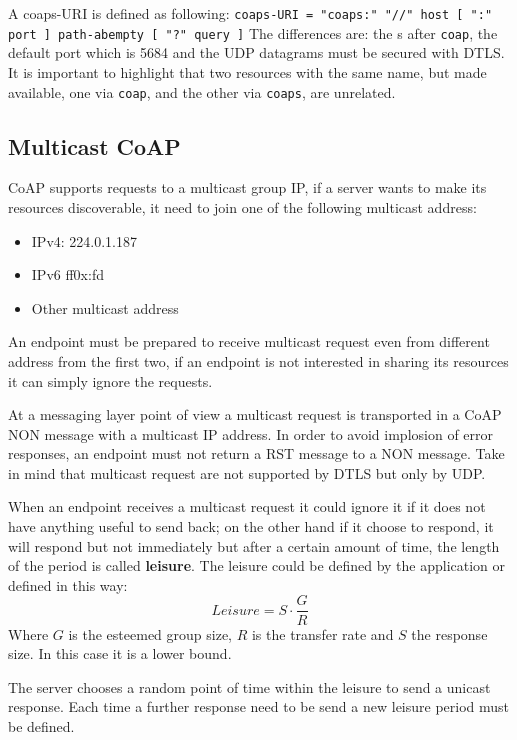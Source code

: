 	A coaps-URI is defined as following:
	\texttt{coaps-URI = "coaps:" "//" host [ ":" port ] path-abempty [ "?" query ]}
	The differences are: the s after \texttt{coap}, the default port which is 5684 and the UDP datagrams must be secured with DTLS.
	It is important to highlight that two resources with the same name, but made available, one via \texttt{coap}, and the other via \texttt{coaps}, are unrelated.
	
	\subsection{Multicast CoAP}
	CoAP supports requests to a multicast group IP, if a server wants to make its resources discoverable, it need to join one of the following multicast address:
	\begin{itemize}
		\item 	IPv4: 224.0.1.187
		\item IPv6 ff0x:fd
		\item Other multicast address
	\end{itemize}

	An endpoint must be prepared to receive multicast request even from different address from the first two, if an endpoint is not interested in sharing its resources it can simply ignore the requests.
	
	At a messaging layer point of view a multicast request is transported in a CoAP NON message with a multicast IP address.\newline
	In order to avoid implosion of error responses, an endpoint must not return a RST message to a NON message.\newline
	Take in mind that multicast request are not supported by DTLS but only by UDP.
	
	When an endpoint receives a multicast request it could ignore it if it does not have anything useful to send back; on the other hand if it choose to respond, it will respond but not immediately but after a certain amount of time, the length of the period is called \textbf{leisure}.
	The leisure could be defined by the application or defined in this way:
	\begin{equation}Leisure=S\cdot\frac{G}{R}\end{equation}
	Where $G$ is the esteemed group size, $R$ is the transfer rate and $S$ the response size.
	In this case it is a lower bound.
	
	The server chooses a random point of time within the leisure to send a unicast response.
	Each time a further response need to be send a new leisure period must be defined.
	
